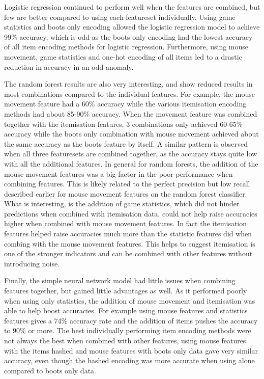 \documentclass[Report.tex]{subfiles}
\begin{document}
Logistic regression continued to perform well when the features are combined, but few are better compared to using each featureset individually. Using game statistics and boots only encoding allowed the logistic regression model to achieve 99\% accuracy, which is odd as the boots only encoding had the lowest accuracy of all item encoding methods for logistic regression. 
Furthermore, using mouse movement, game statistics and one-hot encoding of all items led to a drastic reduction in accuracy in an odd anomaly.  

The random forest results are also very interesting, and show reduced results in most combinations compared to the individual features. For example, the mouse movement feature had a 60\% accuracy while the various itemisation encoding methods had about 85-90\% accuracy. When the movement feature was combined together with the itemisation features, 3 combinations only achieved 60-65\% accuracy while the boots only combination with mouse movement achieved about the same accuracy as the boots feature by itself. A similar pattern is observed when all three featuresets are combined together, as the accuracy stays quite low with all the additional features. In general for random forests, the addition of the mouse movement features was a big factor in the poor performance when combining features. This is likely related to the perfect precision but low recall described earlier for mouse movement features on the random forest classifier. What is interesting, is the addition of game statistics, which did not hinder predictions when combined with itemisation data, could not help raise accuracies higher when combined with mouse movement features. In fact the itemisation features helped raise accuracies much more than the statistic features did when combing with the mouse movement features. This helps to suggest itemisation is one of the stronger indicators and can be combined with other features without introducing noise. %

Finally, the simple neural network model had little issues when combining features together, but gained little advantages as well. As it performed poorly when using only statistics, the addition of mouse movement and itemisation was able to help boost accuracies. For example using mouse features and statistics features gives a 74\% accuracy rate and the addition of items pushes the accuracy to 90\% or more. The best individually performing item encoding methods were not always the best when combined with other features, using mouse features with the items hashed and mouse features with boots only data gave very similar accuracy, even though the hashed encoding was more accurate when using alone compared to boots only data.
\end{document}
